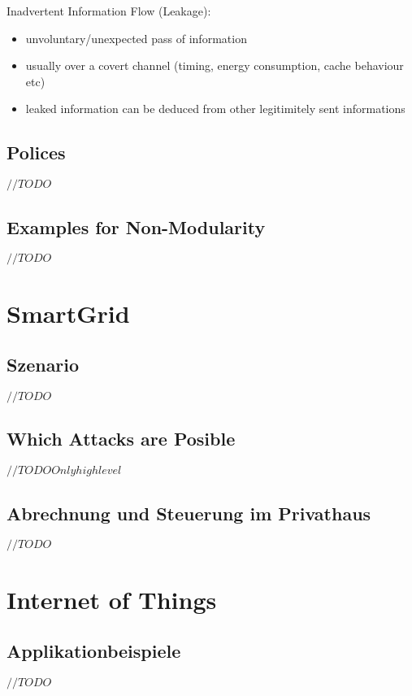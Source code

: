 \documentclass[a4paper, 12pt]{article}
\begin{document}
Inadvertent Information Flow (Leakage):\\
\begin{itemize}
\item unvoluntary/unexpected pass of information
\item usually over a covert channel (timing, energy consumption, cache behaviour etc)
\item leaked information can be deduced from other legitimitely sent informations
\end{itemize}
\subsection{Polices}
$ //TODO $
\subsection{Examples for Non-Modularity}
$ //TODO $

\section{SmartGrid}
\subsection{Szenario}
$ //TODO $
\subsection{Which Attacks are Posible}
$ //TODO Only highlevel$
\subsection{Abrechnung und Steuerung im Privathaus}
$ //TODO $

\section{Internet of Things}
\subsection{Applikationbeispiele}
$ //TODO $
\end{document}

